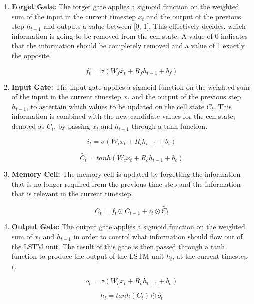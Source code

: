 \documentclass[a4paper, 12pt]{article}
\numberwithin{equation}{section}
\numberwithin{figure}{section}
\numberwithin{table}{section}
\begin{document}
	\begin{enumerate}
		
		\item \textbf{Forget Gate:} The forget gate applies a sigmoid function on the weighted sum of the  input in the current timestep $x_{t}$ and the output of the previous step $h_{t-1}$ and outputs a value between [0, 1]. This effectively decides, which information is going to be removed from the cell state. A value of 0 indicates that the information should be completely removed and a value of 1 exactly the opposite.
		
		\begin{equation}
			f_{t} = \sigma(W_{f}x_{t} + R_{f}h_{t-1} + b_{f})
		\end{equation}
		
		\item \textbf{Input Gate:} The input gate applies a sigmoid function on the weighted sum of the  input in the current timestep $x_{t}$ and the output of the previous step $h_{t-1}$, to ascertain which values to be updated on the cell state $C_{t}$.
		This information is combined with the new candidate values for the cell state, denoted as $\widetilde{C_{t}}$, by passing $x_{t}$ and $h_{t-1}$ through a tanh function.
		
		\begin{equation}
			i_{t} = \sigma(W_{i}x_{t} + R_{i}h_{t-1} + b_{i})
		\end{equation}
		
		\begin{equation}
			\widetilde{C_{t}} = tanh(W_{c}x_{t} + R_{c}h_{t-1} + b_{c})
		\end{equation}
		
		\item \textbf{Memory Cell:} The memory cell is updated by forgetting the information that is no longer required from the previous time step and the information that is relevant in the current timestep.
		
		\begin{equation}
			C_{t} = f_{t} \odot C_{t-1} + i_{t} \odot \widetilde{C_{t}}
		\end{equation}
		
		\item \textbf{Output Gate:} The output gate applies a sigmoid function on the weighted sum of $x_{t}$ and $h_{t-1}$ in order to control what information should flow out of the LSTM unit. The result of this gate is then passed through a tanh function to produce the output of the LSTM unit $h_t$, at the current timestep $t$.
		
		\begin{equation}
		o_{t} = \sigma(W_{o}x_{t} + R_{o}h_{t-1} + b_{o})
		\end{equation}
		
		\begin{equation}
		h_{t} = tanh(C_{t}) \odot o_{t}
		\end{equation}
	\end{enumerate}
	
\end{document}
